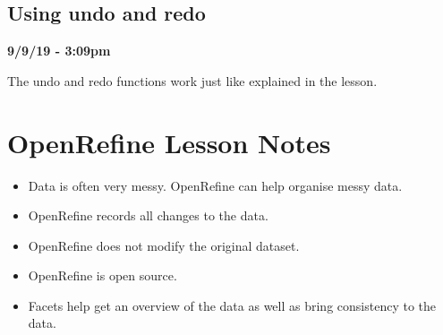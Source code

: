 \documentclass{article}
\begin{document}
\subsection{Using undo and redo}

\textbf{9/9/19 - 3:09pm}

The undo and redo functions work just like explained in the lesson.

\newpage
\section{OpenRefine Lesson Notes}

\begin{itemize}
    \item Data is often very messy. OpenRefine can help organise messy data.
    \item OpenRefine records all changes to the data.
    \item OpenRefine does not modify the original dataset.
    \item OpenRefine is open source.
    \item Facets help get an overview of the data as well as bring consistency to the data.
\end{itemize}
\end{document}
